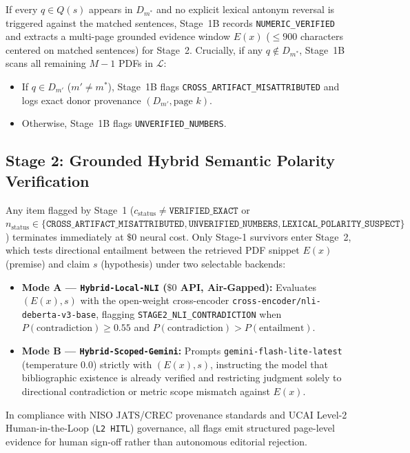 \documentclass[10pt,twocolumn]{article}
\begin{document}
If every $q \in Q(s)$ appears in $D_{m^*}$ and no explicit lexical antonym reversal is triggered against the matched sentences, Stage~1B records \texttt{NUMERIC\_VERIFIED} and extracts a multi-page grounded evidence window $E(x)$ ($\le 900$ characters centered on matched sentences) for Stage~2. Crucially, if any $q \notin D_{m^*}$, Stage~1B scans all remaining $M - 1$ PDFs in $\mathcal{L}$:
\begin{itemize}
  \item If $q \in D_{m'}$ ($m' \neq m^*$), Stage~1B flags \texttt{CROSS\_ARTIFACT\_MISATTRIBUTED} and logs exact donor provenance $(D_{m'}, \text{page } k)$.
  \item Otherwise, Stage~1B flags \texttt{UNVERIFIED\_NUMBERS}.
\end{itemize}

\subsection{Stage 2: Grounded Hybrid Semantic Polarity Verification}
Any item flagged by Stage~1 ($c_{\text{status}} \neq \texttt{VERIFIED\_EXACT}$ or $n_{\text{status}} \in \{\texttt{CROSS\_ARTIFACT\_MISATTRIBUTED}, \texttt{UNVERIFIED\_NUMBERS}, \texttt{LEXICAL\_POLARITY\_SUSPECT}\}$) terminates immediately at $\$0$ neural cost. Only Stage-1 survivors enter Stage~2, which tests directional entailment between the retrieved PDF snippet $E(x)$ (premise) and claim $s$ (hypothesis) under two selectable backends:
\begin{itemize}
  \item \textbf{Mode A --- \texttt{Hybrid-Local-NLI} ($\$0$ API, Air-Gapped):} Evaluates $(E(x), s)$ with the open-weight cross-encoder \texttt{cross-encoder/nli-deberta-v3-base}, flagging \texttt{STAGE2\_NLI\_CONTRADICTION} when $P(\text{contradiction}) \ge 0.55$ and $P(\text{contradiction}) > P(\text{entailment})$.
  \item \textbf{Mode B --- \texttt{Hybrid-Scoped-Gemini}:} Prompts \texttt{gemini-flash-lite-latest} (temperature $0.0$) strictly with $(E(x), s)$, instructing the model that bibliographic existence is already verified and restricting judgment solely to directional contradiction or metric scope mismatch against $E(x)$.
\end{itemize}
In compliance with NISO JATS/CREC provenance standards \cite{niso2024jats,niso2024crec} and UCAI Level-2 Human-in-the-Loop (\texttt{L2 HITL}) governance, all flags emit structured page-level evidence for human sign-off rather than autonomous editorial rejection.
\end{document}
